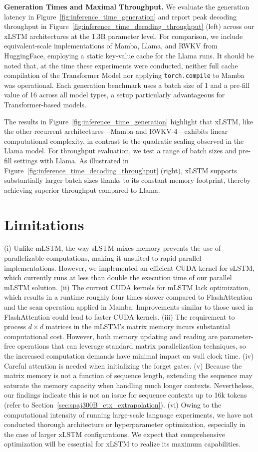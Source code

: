 \textbf{Generation Times and Maximal Throughput.} We evaluate the generation latency in Figure~\ref{fig:inference_time_generation} and report peak decoding throughput in Figure~\ref{fig:inference_time_decoding_throughput} (left) across our xLSTM architectures at the 1.3B parameter level. For comparison, we include equivalent-scale implementations of Mamba, Llama, and RWKV from HuggingFace, employing a static key-value cache for the Llama runs. It should be noted that, at the time these experiments were conducted, neither full cache compilation of the Transformer Model nor applying \texttt{torch.compile} to Mamba was operational. Each generation benchmark uses a batch size of 1 and a pre-fill value of 16 across all model types, a setup particularly advantageous for Transformer-based models.

The results in Figure~\ref{fig:inference_time_generation} highlight that xLSTM, like the other recurrent architectures—Mamba and RWKV-4—exhibits linear computational complexity, in contrast to the quadratic scaling observed in the Llama model. For throughput evaluation, we test a range of batch sizes and pre-fill settings with Llama. As illustrated in Figure~\ref{fig:inference_time_decoding_throughput} (right), xLSTM supports substantially larger batch sizes thanks to its constant memory footprint, thereby achieving superior throughput compared to Llama.

\section{Limitations}

(i) Unlike mLSTM, the way sLSTM mixes memory prevents the use of parallelizable computations, making it unsuited to rapid parallel implementations. However, we implemented an efficient CUDA kernel for sLSTM, which currently runs at less than double the execution time of our parallel mLSTM solution. (ii) The current CUDA kernels for mLSTM lack optimization, which results in a runtime roughly four times slower compared to FlashAttention and the scan operation applied in Mamba. Improvements similar to those used in FlashAttention could lead to faster CUDA kernels. (iii) The requirement to process $d \times d$ matrices in the mLSTM’s matrix memory incurs substantial computational cost. However, both memory updating and reading are parameter-free operations that can leverage standard matrix parallelization techniques, so the increased computation demands have minimal impact on wall clock time. (iv) Careful attention is needed when initializing the forget gates. (v) Because the matrix memory is not a function of sequence length, extending the sequence may saturate the memory capacity when handling much longer contexts. Nevertheless, our findings indicate this is not an issue for sequence contexts up to 16k tokens (refer to Section~\ref{sec:spaj300B_ctx_extrapolation}). (vi) Owing to the computational intensity of running large-scale language experiments, we have not conducted thorough architecture or hyperparameter optimization, especially in the case of larger xLSTM configurations. We expect that comprehensive optimization will be essential for xLSTM to realize its maximum capabilities.


